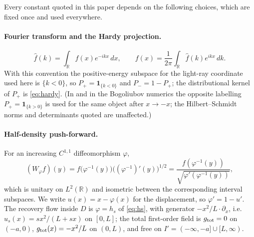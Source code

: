 \label{app:conventions}
Every constant quoted in this paper depends on the following choices, which are
fixed once and used everywhere.

\paragraph{Fourier transform and the Hardy projection.}
\begin{equation}\label{eq:fourier}
 \widehat f(k)=\int_{\mathbb R}f(x)e^{-ikx}\,dx,
 \qquad
 f(x)=\frac1{2\pi}\int_{\mathbb R}\widehat f(k)e^{ikx}\,dk .
\end{equation}
With this convention the positive-energy subspace for the light-ray coordinate
used here is $\{k<0\}$, so $P_+=\mathbf1_{\{k<0\}}$ and $P_-=1-P_+$; the
distributional kernel of $P_+$ is \eqref{eq:hardy}.  (In
\cite{RigorUB} and in the Bogoliubov numerics the opposite labelling
$P_+=\mathbf1_{\{k>0\}}$ is used for the same object after $x\to-x$; the
Hilbert--Schmidt norms and determinants quoted are unaffected.)

\paragraph{Half-density push-forward.}
For an increasing $C^{1,1}$ diffeomorphism $\varphi$,
\begin{equation}\label{eq:pushforward}
 (W_\varphi f)(y)=f\bigl(\varphi^{-1}(y)\bigr)
 \bigl((\varphi^{-1})'(y)\bigr)^{1/2}
 =\frac{f(\varphi^{-1}(y))}{\sqrt{\varphi'(\varphi^{-1}(y))}} ,
\end{equation}
which is unitary on $L^2(\mathbb R)$ and isometric between the corresponding
interval subspaces.  We write $u(x)=x-\varphi(x)$ for the displacement, so
$\varphi'=1-u'$.  The recovery flow inside $D$ is
$\varphi=h_s$ of \eqref{eq:hs}, with generator $-x^2/L\cdot\partial_x$, i.e.\
$u_s(x)=sx^2/(L+sx)$ on $[0,L]$; the total first-order field is
$g_{\rm tot}=0$ on $(-a,0)$, $g_{\rm tot}(x)=-x^2/L$ on $(0,L)$, and free on
$I'=(-\infty,-a]\cup[L,\infty)$.

